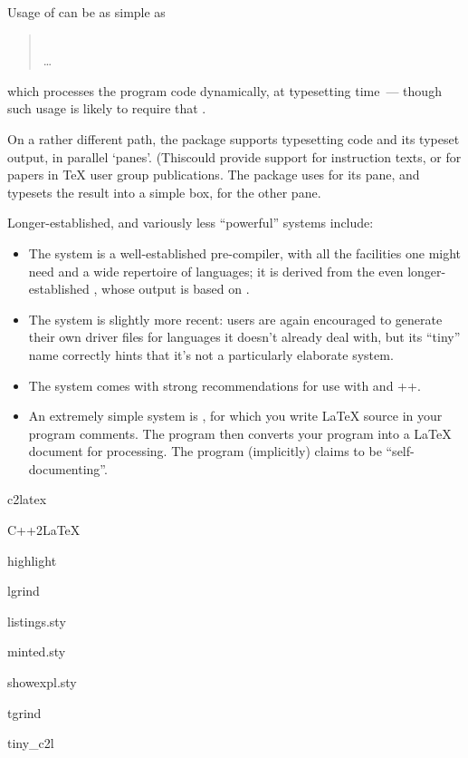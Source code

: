Usage of  can be as simple as
\begin{quote}
  \\
  \dots{}\\
\end{quote}
which processes the program code dynamically, at typesetting time~---
though such usage is likely to require that %
.

On a rather different path, the package  supports
typesetting \alltex{} code and its typeset output, in parallel
`panes'.  (Thiscould provide support for \alltex{} instruction texts,
or for papers in \TeX{} user group publications.  The package uses
 for its \alltex{} pane, and typesets the result
into a simple box, for the other pane.

Longer-established, and variously less ``powerful'' systems include:
\begin{itemize}
\item The  system is a well-established
  pre-compiler, with all the facilities one might need and a wide
  repertoire of languages; it is derived from the even
  longer-established , whose output is based on
  \plaintex{}.
\item The  system is slightly more recent: users
  are again encouraged to generate their own driver files for
  languages it doesn't already deal with, but its ``tiny'' name
  correctly hints that it's not a particularly elaborate system.
\item The  system comes with strong
  recommendations for use with  and ++.
\item An extremely simple system is , for which you
  write \LaTeX{} source in your  program comments.  The
  program then converts your program into a \LaTeX{} document for
  processing.  The program (implicitly) claims to be
  ``self-documenting''.
\end{itemize}
\begin{ctanrefs}
\item[c2latex]
\item[C++2LaTeX]
\item[highlight]
\item[lgrind]
\item[listings.sty]
\item[minted.sty]
\item[showexpl.sty]
\item[tgrind]
\item[tiny\_c2l]
\end{ctanrefs}

